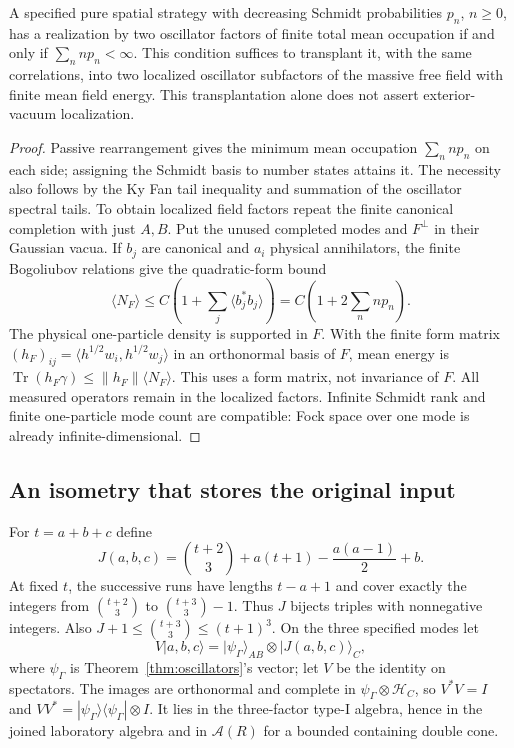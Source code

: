\begin{proposition}\label{prop:finite-index}
A specified pure spatial strategy with decreasing Schmidt probabilities $p_n$, $n\ge0$, has a realization by two oscillator factors of finite total mean occupation if and only if $\sum_n n p_n<\infty$. This condition suffices to transplant it, with the same correlations, into two localized oscillator subfactors of the massive free field with finite mean field energy. This transplantation alone does not assert exterior-vacuum localization.
\end{proposition}
\begin{proof}
Passive rearrangement gives the minimum mean occupation $\sum_nnp_n$ on each side; assigning the Schmidt basis to number states attains it. The necessity also follows by the Ky Fan tail inequality and summation of the oscillator spectral tails. To obtain localized field factors repeat the finite canonical completion with just $A,B$. Put the unused completed modes and $F^\perp$ in their Gaussian vacua. If $b_j$ are canonical and $a_i$ physical annihilators, the finite Bogoliubov relations give the quadratic-form bound
\[
 \langle N_F\rangle\le C(1+\sum_j\langle b_j^*b_j\rangle)
       =C(1+2\sum_nnp_n).
\]
The physical one-particle density is supported in $F$. With the finite form matrix $(h_F)_{ij}=\langle h^{1/2}w_i,h^{1/2}w_j\rangle$ in an orthonormal basis of $F$, mean energy is $\operatorname{Tr}(h_F\gamma)\le\|h_F\|\langle N_F\rangle$. This uses a form matrix, not invariance of $F$. All measured operators remain in the localized factors. Infinite Schmidt rank and finite one-particle mode count are compatible: Fock space over one mode is already infinite-dimensional.
\end{proof}

\subsection{An isometry that stores the original input}
For $t=a+b+c$ define
\[
 J(a,b,c)=\binom{t+2}{3}+a(t+1)-\frac{a(a-1)}2+b.
\]
At fixed $t$, the successive runs have lengths $t-a+1$ and cover exactly the integers from $\binom{t+2}{3}$ to $\binom{t+3}{3}-1$. Thus $J$ bijects triples with nonnegative integers. Also $J+1\le\binom{t+3}{3}\le(t+1)^3$.
On the three specified modes let
\[
 V|a,b,c\rangle=|\psi_\Gamma\rangle_{AB}\otimes|J(a,b,c)\rangle_C,
\]
where $\psi_\Gamma$ is Theorem~\ref{thm:oscillators}'s vector; let $V$ be the identity on spectators. The images are orthonormal and complete in $\psi_\Gamma\otimes\mathcal H_C$, so $V^*V=I$ and $VV^*=|\psi_\Gamma\rangle\langle\psi_\Gamma|\otimes I$. It lies in the three-factor type-I algebra, hence in the joined laboratory algebra and in $\mathcal A(R)$ for a bounded containing double cone.

